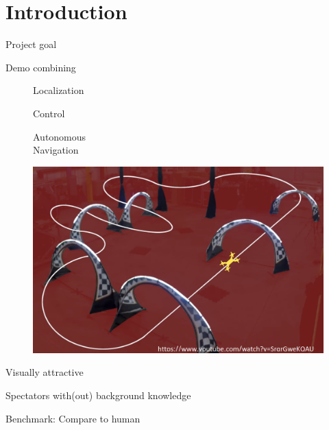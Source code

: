 \section{Introduction}
\label{sec:Intro}

\begin{frame}{Project goal}

    \bit[label=\raisebox{0.25ex}{\tiny$\bullet$}]
        \item Demo combining
            \begin{figure}[H]
                \centering
                \begin{minipage}{.35\textwidth}
                    \bit[label=\raisebox{0.25ex}{\tiny$\bullet$}]
                        \item Localization
                        \item Control
                        \item Autonomous\\
                              Navigation
                    \eit
                \end{minipage} 
                \hspace{5mm}
                \begin{minipage}{0.50\textwidth}
                    \centering
                    \includegraphics[width=\textwidth]{Figures/Drone_intro.png}
                    \label{fig:bebop}
                \end{minipage}
            \end{figure}

        \item Visually attractive
        \vspace{5mm}
        \item Spectators with(out) background knowledge
        \vspace{5mm}
        \item Benchmark: Compare to human
    \eit
    		
\end{frame}
